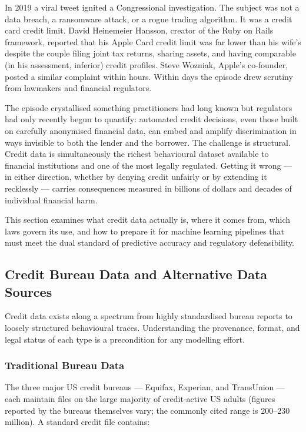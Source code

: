 \begin{context}

In 2019 a viral tweet ignited a Congressional investigation. The subject was not a data breach, a ransomware attack, or a rogue trading algorithm. It was a credit card credit limit. David Heinemeier Hansson, creator of the Ruby on Rails framework, reported that his Apple Card credit limit was far lower than his wife's despite the couple filing joint tax returns, sharing assets, and having comparable (in his assessment, inferior) credit profiles. Steve Wozniak, Apple's co-founder, posted a similar complaint within hours. Within days the episode drew scrutiny from lawmakers and financial regulators.

The episode crystallised something practitioners had long known but regulators had only recently begun to quantify: automated credit decisions, even those built on carefully anonymised financial data, can embed and amplify discrimination in ways invisible to both the lender and the borrower. The challenge is structural. Credit data is simultaneously the richest behavioural dataset available to financial institutions and one of the most legally regulated. Getting it wrong --- in either direction, whether by denying credit unfairly or by extending it recklessly --- carries consequences measured in billions of dollars and decades of individual financial harm.

This section examines what credit data actually is, where it comes from, which laws govern its use, and how to prepare it for machine learning pipelines that must meet the dual standard of predictive accuracy and regulatory defensibility.

\subsection{Credit Bureau Data and Alternative Data Sources}
\label{subsec:credit-bureau}

Credit data exists along a spectrum from highly standardised bureau reports to loosely structured behavioural traces. Understanding the provenance, format, and legal status of each type is a precondition for any modelling effort.

\subsubsection*{Traditional Bureau Data}

The three major US credit bureaus --- Equifax, Experian, and TransUnion --- each maintain files on the large majority of credit-active US adults (figures reported by the bureaus themselves vary; the commonly cited range is 200--230 million). A standard credit file contains:


\end{context}
